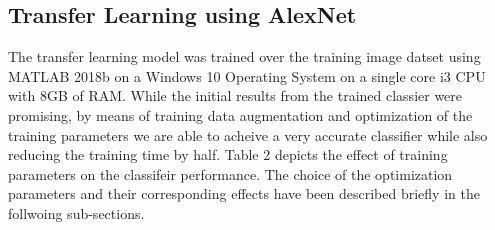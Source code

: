 \documentclass[doc/report.tex]{subfiles}
\begin{document}
\subsection{Transfer Learning using AlexNet}
The transfer learning model was trained over the training image datset using MATLAB 2018b on a Windows 10 Operating System on a single core i3 CPU with 8GB of RAM. While the initial results from the trained classier were promising, by means of training data augmentation and optimization of the training parameters we are able to acheive a very accurate classifier while also reducing the training time by half. Table 2 depicts the effect of training parameters on the classifeir performance. The choice of the optimization parameters and their corresponding effects have been described briefly in the follwoing sub-sections.

\begin{table}[h]
\centering
\caption{Training Parameter Analysis}
\label{tab:my-table2}
\end{table}


    
\end{document}
